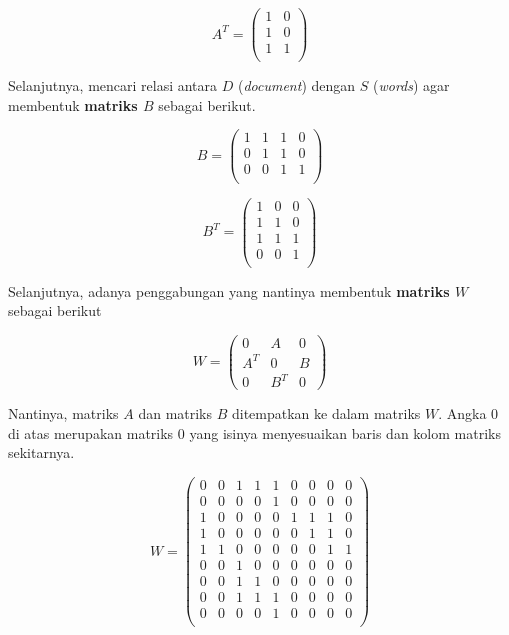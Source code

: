 \begin{equation}
    A^T = \begin{pmatrix}
1 & 0 \\
1 & 0 \\
1 & 1 \\
\end{pmatrix}
\end{equation}

Selanjutnya, mencari relasi antara $D$ (\textit{document}) dengan $S$ (\textit{words}) agar membentuk \textbf{matriks $B$} sebagai berikut.

\begin{equation}
    B = \begin{pmatrix}
1 & 1 & 1 & 0 \\
0 & 1 & 1 & 0 \\
0 & 0 & 1 & 1 \\
\end{pmatrix}
\end{equation}

\begin{equation}
    B^T = \begin{pmatrix}
1 & 0 & 0 \\
1 & 1 & 0 \\
1 & 1 & 1 \\
0 & 0 & 1 \\
\end{pmatrix}
\end{equation}

Selanjutnya, adanya penggabungan yang nantinya membentuk \textbf{matriks $W$} sebagai berikut

\begin{equation*}
    W = \begin{pmatrix}
0 & A & 0\\
A^T & 0 & B\\
0 & B^T & 0
\end{pmatrix}
\end{equation*}

Nantinya, matriks $A$ dan matriks $B$ ditempatkan ke dalam matriks $W$. Angka 0 di atas merupakan matriks 0 yang isinya menyesuaikan baris dan kolom matriks sekitarnya.

\begin{equation}
    W = \begin{pmatrix}
0 & 0 & 1 & 1 & 1 & 0 & 0 & 0 & 0 \\
0 & 0 & 0 & 0 & 1 & 0 & 0 & 0 & 0 \\
1 & 0 & 0 & 0 & 0 & 1 & 1 & 1 & 0 \\
1 & 0 & 0 & 0 & 0 & 0 & 1 & 1 & 0 \\
1 & 1 & 0 & 0 & 0 & 0 & 0 & 1 & 1 \\
0 & 0 & 1 & 0 & 0 & 0 & 0 & 0 & 0 \\
0 & 0 & 1 & 1 & 0 & 0 & 0 & 0 & 0 \\
0 & 0 & 1 & 1 & 1 & 0 & 0 & 0 & 0 \\
0 & 0 & 0 & 0 & 1 & 0 & 0 & 0 & 0 \\
\end{pmatrix}
\end{equation}

